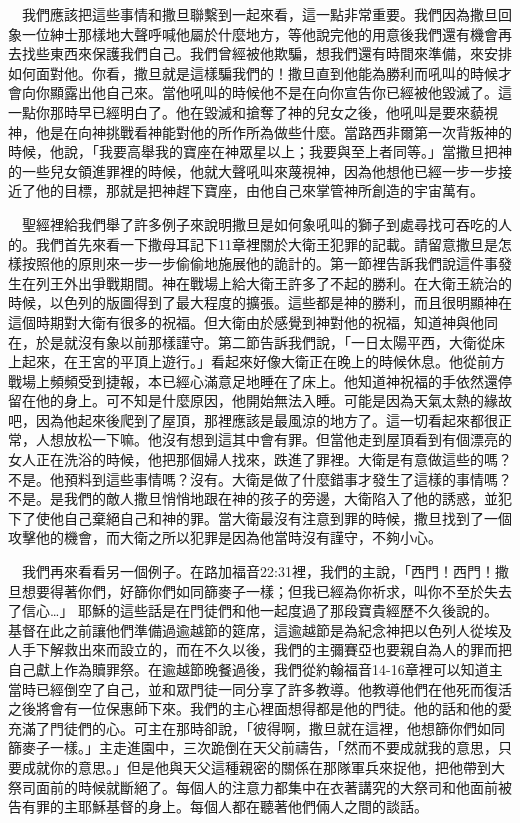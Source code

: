 \documentclass{book}
\begin{document}
　我們應該把這些事情和撒旦聯繫到一起來看，這一點非常重要。我們因為撒旦回象一位紳士那樣地大聲呼喊他屬於什麼地方，等他說完他的用意後我們還有機會再去找些東西來保護我們自己。我們曾經被他欺騙，想我們還有時間來準備，來安排如何面對他。你看，撒旦就是這樣騙我們的！撒旦直到他能為勝利而吼叫的時候才會向你顯露出他自己來。當他吼叫的時候他不是在向你宣告你已經被他毀滅了。這一點你那時早已經明白了。他在毀滅和搶奪了神的兒女之後，他吼叫是要來藐視神，他是在向神挑戰看神能對他的所作所為做些什麼。當路西非爾第一次背叛神的時候，他說，「我要高舉我的寶座在神眾星以上；我要與至上者同等。」當撒旦把神的一些兒女領進罪裡的時候，他就大聲吼叫來蔑視神，因為他想他已經一步一步接近了他的目標，那就是把神趕下寶座，由他自己來掌管神所創造的宇宙萬有。

　聖經裡給我們舉了許多例子來說明撒旦是如何象吼叫的獅子到處尋找可吞吃的人的。我們首先來看一下撒母耳記下11章裡關於大衛王犯罪的記載。請留意撒旦是怎樣按照他的原則來一步一步偷偷地施展他的詭計的。第一節裡告訴我們說這件事發生在列王外出爭戰期間。神在戰場上給大衛王許多了不起的勝利。在大衛王統治的時候，以色列的版圖得到了最大程度的擴張。這些都是神的勝利，而且很明顯神在這個時期對大衛有很多的祝福。但大衛由於感覺到神對他的祝福，知道神與他同在，於是就沒有象以前那樣謹守。第二節告訴我們說，「一日太陽平西，大衛從床上起來，在王宮的平頂上遊行。」看起來好像大衛正在晚上的時候休息。他從前方戰場上頻頻受到捷報，本已經心滿意足地睡在了床上。他知道神祝福的手依然還停留在他的身上。可不知是什麼原因，他開始無法入睡。可能是因為天氣太熱的緣故吧，因為他起來後爬到了屋頂，那裡應該是最風涼的地方了。這一切看起來都很正常，人想放松一下嘛。他沒有想到這其中會有罪。但當他走到屋頂看到有個漂亮的女人正在洗浴的時候，他把那個婦人找來，跌進了罪裡。大衛是有意做這些的嗎？不是。他預料到這些事情嗎？沒有。大衛是做了什麼錯事才發生了這樣的事情嗎？不是。是我們的敵人撒旦悄悄地跟在神的孩子的旁邊，大衛陷入了他的誘惑，並犯下了使他自己棄絕自己和神的罪。當大衛最沒有注意到罪的時候，撒旦找到了一個攻擊他的機會，而大衛之所以犯罪是因為他當時沒有謹守，不夠小心。

　我們再來看看另一個例子。在路加福音22:31裡，我們的主說，「西門！西門！撒旦想要得著你們，好篩你們如同篩麥子一樣；但我已經為你祈求，叫你不至於失去了信心…」 耶穌的這些話是在門徒們和他一起度過了那段寶貴經歷不久後說的。基督在此之前讓他們準備過逾越節的筵席，這逾越節是為紀念神把以色列人從埃及人手下解救出來而設立的，而在不久以後，我們的主彌賽亞也要親自為人的罪而把自己獻上作為贖罪祭。在逾越節晚餐過後，我們從約翰福音14-16章裡可以知道主當時已經倒空了自己，並和眾門徒一同分享了許多教導。他教導他們在他死而復活之後將會有一位保惠師下來。我們的主心裡面想得都是他的門徒。他的話和他的愛充滿了門徒們的心。可主在那時卻說，「彼得啊，撒旦就在這裡，他想篩你們如同篩麥子一樣。」主走進園中，三次跪倒在天父前禱告，「然而不要成就我的意思，只要成就你的意思。」但是他與天父這種親密的關係在那隊軍兵來捉他，把他帶到大祭司面前的時候就斷絕了。每個人的注意力都集中在衣著講究的大祭司和他面前被告有罪的主耶穌基督的身上。每個人都在聽著他們倆人之間的談話。
\end{document}
